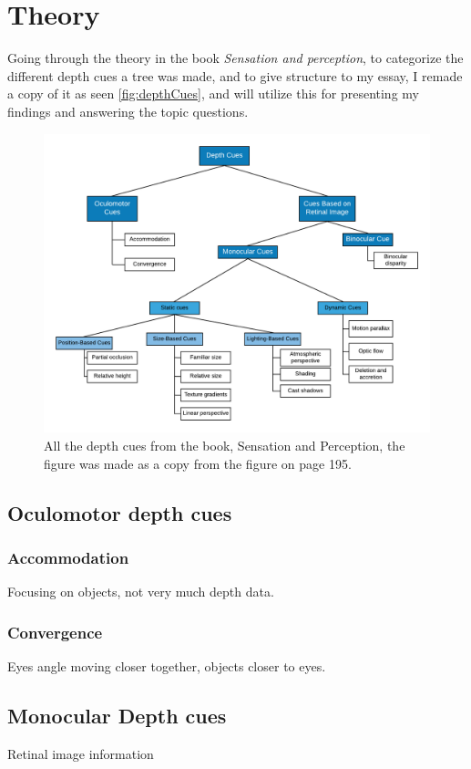 \section{Theory}
	Going through the theory in the book \textit{Sensation and perception}, to categorize the different depth cues a tree was made, and to give structure to my essay, I remade a copy of it as seen \autoref{fig:depthCues}, and will utilize this for presenting my findings and answering the topic questions.
	\begin{figure}[H]
		\centering
		\includegraphics[width=1\linewidth]{figure/depthcues}
		\caption{All the depth cues from the book, Sensation and Perception\citep{sensationPerception}, the figure was made as a copy from the figure on page 195.}
		\label{fig:depthCues}
	\end{figure}
	\subsection{Oculomotor depth cues}
		\subsubsection{Accommodation}
			Focusing on objects, not very much depth data.
		\subsubsection{Convergence}
			Eyes angle moving closer together, objects closer to eyes.
	\subsection{Monocular Depth cues}
		Retinal image information
